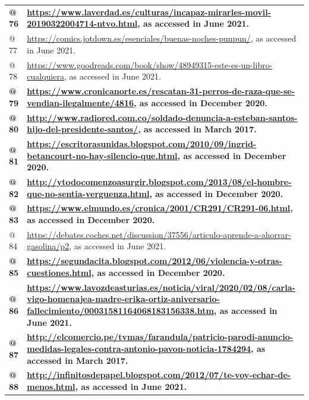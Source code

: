 \begin{flushleft}
\begin{supertabular}{m{0.7955598in}m{5.35876in}}
{\bfseries \textmd{@ 76 }} &
{\bfseries \url{https://www.laverdad.es/culturas/incapaz-mirarles-movil-20190322004714-ntvo.html}\textmd{, as accessed in June 2021.}}\\
@ 77  &
\url{https://comics.jotdown.es/esenciales/buenas-noches-punpun/}, as accessed in June 2021.\\
@ 78  &
\url{https://www.goodreads.com/book/show/48949315-este-es-un-libro-cualquiera}, as accessed in June 2021.\\
{\bfseries \textmd{@ 79 }} &
{\bfseries \url{https://www.cronicanorte.es/rescatan-31-perros-de-raza-que-se-vendian-ilegalmente/4816}\textmd{, as accessed in December 2020.}}\\
{\bfseries \textmd{@ 80 }} &
{\bfseries \url{http://www.radiored.com.co/soldado-denuncia-a-esteban-santos-hijo-del-presidente-santos/}\textmd{, as accessed in March 2017.}}\\
{\bfseries \textmd{@ 81 }} &
{\bfseries \url{https://escritorasunidas.blogspot.com/2010/09/ingrid-betancourt-no-hay-silencio-que.html}\textmd{, as accessed in December 2020.}}\\
{\bfseries \textmd{@ 82 }} &
{\bfseries \url{http://ytodocomenzoasurgir.blogspot.com/2013/08/el-hombre-que-no-sentia-verguenza.html}\textmd{, as accessed in December 2020.}}\\
{\bfseries \textmd{@ 83 }} &
{\bfseries \url{https://www.elmundo.es/cronica/2001/CR291/CR291-06.html}\textmd{, as accessed in December 2020.}}\\
@ 84  &
\url{https://debates.coches.net/discussion/37556/articulo-aprende-a-ahorrar-gasolina/p2}, as accessed in June 2021.\\
{\bfseries \textmd{@ 85 }} &
{\bfseries \url{https://segundacita.blogspot.com/2012/06/violencia-y-otras-cuestiones.html}\textmd{, as accessed in December 2020.}}\\
{\bfseries \textmd{@ 86 }} &
{\bfseries \url{https://www.lavozdeasturias.es/noticia/viral/2020/02/08/carla-vigo-homenajea-madre-erika-ortiz-aniversario-fallecimiento/00031581164068183156338.htm}\textmd{, as accessed in June 2021.}}\\
{\bfseries \textmd{@ 87 }} &
{\bfseries \url{http://elcomercio.pe/tvmas/farandula/patricio-parodi-anuncio-medidas-legales-contra-antonio-pavon-noticia-1784294}\textmd{, as accessed in March 2017.}}\\
{\bfseries \textmd{@ 88 }} &
{\bfseries \url{http://infinitosdepapel.blogspot.com/2012/07/te-voy-echar-de-menos.html}\textmd{, as accessed in June 2021.}}\\

\end{supertabular}
\end{flushleft}
